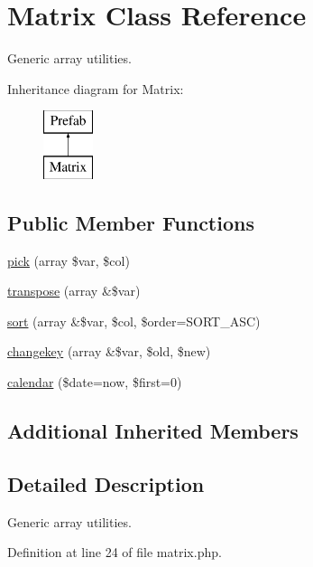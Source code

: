 \hypertarget{class_matrix}{}\section{Matrix Class Reference}
\label{class_matrix}


Generic array utilities.  


Inheritance diagram for Matrix\+:\begin{figure}[H]
\begin{center}
\leavevmode
\includegraphics[height=2.000000cm]{class_matrix}
\end{center}
\end{figure}
\subsection*{Public Member Functions}
\begin{DoxyCompactItemize}
\item 
\hyperlink{class_matrix_a9250319756cfbce1fe9abc91674da7af}{pick} (array \$var, \$col)
\item 
\hyperlink{class_matrix_a6d4735de341c39cc39660b8bf582c7ba}{transpose} (array \&\$var)
\item 
\hyperlink{class_matrix_aae304eafdd6b452a6c922a5eda8bb0d0}{sort} (array \&\$var, \$col, \$order=S\+O\+R\+T\+\_\+\+A\+SC)
\item 
\hyperlink{class_matrix_aac5852b6570ed382e8c3c42e6edb9e8b}{changekey} (array \&\$var, \$old, \$new)
\item 
\hyperlink{class_matrix_a265458287034dc5692c5890daffd799b}{calendar} (\$date=\textquotesingle{}now\textquotesingle{}, \$first=0)
\end{DoxyCompactItemize}
\subsection*{Additional Inherited Members}


\subsection{Detailed Description}
Generic array utilities. 

Definition at line 24 of file matrix.\+php.



